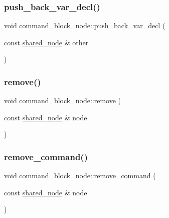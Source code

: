 \subsubsection{\texorpdfstring{push\+\_\+back\+\_\+var\+\_\+decl()}{push\_back\_var\_decl()}}
{\footnotesize\ttfamily void command\+\_\+block\+\_\+node\+::push\+\_\+back\+\_\+var\+\_\+decl (\begin{DoxyParamCaption}\item[{const \hyperlink{namespacejawe_a3f307481d921b6cbb50cc8511fc2b544}{shared\+\_\+node} \&}]{other }\end{DoxyParamCaption})}

\mbox{\label{classjawe_1_1command__block__node_a0eece1d8e15227e437204a6316ed5feb}} 
\subsubsection{\texorpdfstring{remove()}{remove()}}
{\footnotesize\ttfamily void command\+\_\+block\+\_\+node\+::remove (\begin{DoxyParamCaption}\item[{const \hyperlink{namespacejawe_a3f307481d921b6cbb50cc8511fc2b544}{shared\+\_\+node} \&}]{node }\end{DoxyParamCaption})}

\mbox{\label{classjawe_1_1command__block__node_a8100afe1d2ba0df43c8ac7827ced9d31}} 
\subsubsection{\texorpdfstring{remove\+\_\+command()}{remove\_command()}}
{\footnotesize\ttfamily void command\+\_\+block\+\_\+node\+::remove\+\_\+command (\begin{DoxyParamCaption}\item[{const \hyperlink{namespacejawe_a3f307481d921b6cbb50cc8511fc2b544}{shared\+\_\+node} \&}]{node }\end{DoxyParamCaption})}

